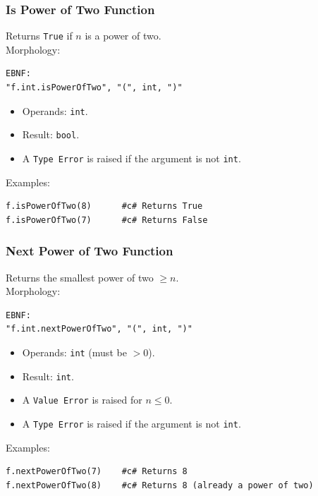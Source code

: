 \subsubsection{Is Power of Two Function}
Returns \texttt{True} if $n$ is a power of two. \\
Morphology:
\begin{verbatim}
EBNF:
"f.int.isPowerOfTwo", "(", int, ")"
\end{verbatim}
\begin{itemize}
\item Operands: \texttt{int}.
\item Result: \texttt{bool}.
\item A \texttt{Type Error} is raised if the argument is not \texttt{int}.
\end{itemize}
Examples:
\begin{verbatim}
f.isPowerOfTwo(8)      #c# Returns True
f.isPowerOfTwo(7)      #c# Returns False
\end{verbatim}

\subsubsection{Next Power of Two Function}
Returns the smallest power of two $\geq n$. \\
Morphology:
\begin{verbatim}
EBNF:
"f.int.nextPowerOfTwo", "(", int, ")"
\end{verbatim}
\begin{itemize}
\item Operands: \texttt{int} (must be $> 0$).
\item Result: \texttt{int}.
\item A \texttt{Value Error} is raised for $n \leq 0$.
\item A \texttt{Type Error} is raised if the argument is not \texttt{int}.
\end{itemize}
Examples:
\begin{verbatim}
f.nextPowerOfTwo(7)    #c# Returns 8
f.nextPowerOfTwo(8)    #c# Returns 8 (already a power of two)
\end{verbatim}

